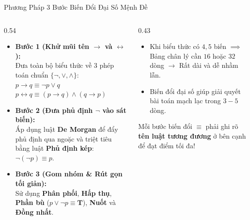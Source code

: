 \documentclass[aspectratio=169, 10pt]{beamer}
\begin{document}
\begin{frame}{Phương Pháp 3 Bước Biến Đổi Đại Số Mệnh Đề}
  \begin{columns}[t, onlytextwidth]
    \begin{column}{0.54\textwidth}
      \begin{cozyMethod}
        \small
        \begin{itemize}
          \setlength{\itemsep}{2.5pt}
          \item \textbf{Bước 1 (Khử mũi tên $\to$ và $\leftrightarrow$):}\\
          Đưa toàn bộ biểu thức về 3 phép toán chuẩn $\{\neg, \lor, \land\}$:\\
          $p \to q \equiv \neg p \lor q$\\
          $p \leftrightarrow q \equiv (p \to q) \land (q \to p)$
          \item \textbf{Bước 2 (Đưa phủ định $\neg$ vào sát biến):}\\
          Áp dụng luật \textbf{De Morgan} để đẩy phủ định qua ngoặc và triệt tiêu bằng luật \textbf{Phủ định kép}: $\neg(\neg p) \equiv p$.
          \item \textbf{Bước 3 (Gom nhóm \& Rút gọn tối giản):}\\
          Sử dụng \textbf{Phân phối}, \textbf{Hấp thụ}, \textbf{Phần bù} ($p \lor \neg p \equiv \mathbf{T}$), \textbf{Nuốt} và \textbf{Đồng nhất}.
        \end{itemize}
      \end{cozyMethod}
    \end{column}
    \begin{column}{0.43\textwidth}
      \begin{cozyInsight}
        \small
        \begin{itemize}
          \setlength{\itemsep}{2pt}
          \item Khi biểu thức có $4, 5$ biến $\implies$ Bảng chân lý cần $16$ hoặc $32$ dòng $\to$ Rất dài và dễ nhầm lẫn.
          \item Biến đổi đại số giúp giải quyết bài toán mạch lạc trong $3 - 5$ dòng.
        \end{itemize}
      \end{cozyInsight}
      \vspace{0.08cm}
      \begin{cozyTrap}
        \small
        Mỗi bước biến đổi $\equiv$ phải ghi rõ \textbf{tên luật tương đương} ở bên cạnh để đạt điểm tối đa!
      \end{cozyTrap}
    \end{column}
  \end{columns}
\end{frame}
\end{document}
